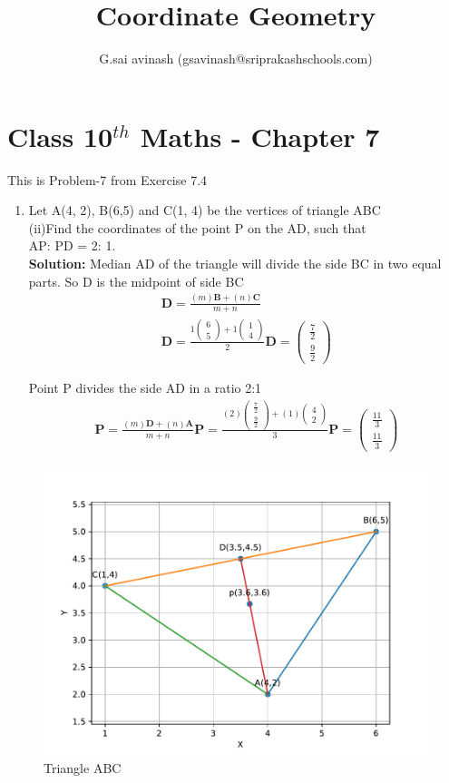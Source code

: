 \documentclass[10pt]{article}
\title{Coordinate Geometry}
\author{G.sai avinash (gsavinash@sriprakashschools.com)}
\newcommand{\myvec}[1]{\ensuremath{\begin{pmatrix}#1\end{pmatrix}}}
\newcommand{\solution}{\noindent \textbf{Solution: }}
\let\vec\mathbf
\begin{document}
\maketitle
\section*{Class 10$^{th}$ Maths - Chapter 7}
This is Problem-7 from Exercise 7.4
\begin{enumerate}
\item   Let A(4, 2), B(6,5) and C(1, 4) be the vertices of triangle ABC\\
(ii)Find the coordinates of the point P on the AD, such that \\
AP: PD = 2: 1.\\
\solution Median AD of the triangle will divide the side BC in two equal parts. So D is the midpoint of side BC\\ 
\begin{align}
\vec{D} = \frac{(m)\vec{B} + (n)\vec{C}}{m+n}\\
\vec{D} = \frac{1\myvec{6\\5} + 1\myvec{1\\4}}{2}
\vec{D} = \myvec{\frac{7}{2}\\\frac{9}{2}}
\end{align}

Point P divides the side AD in a ratio 2:1\\
\begin{align}
\vec{P} =\frac{(m)\vec{D}+(n)\vec{A}}{m+n}
\vec{P} =\frac{(2)\myvec{\frac{7}{2}\\\frac{9}{2}}+(1)\myvec{4\\2}}{3}
\vec{P} =\myvec{\frac{11}{3}\\\frac{11}{3}}
\end{align}
\end{enumerate}
\begin{figure}[H]
			\centering
			\includegraphics[width=\columnwidth]{figs/fig.pdf}
			\caption{Triangle ABC}
			\label{fig:9}
		\end{figure}
\end{document}
